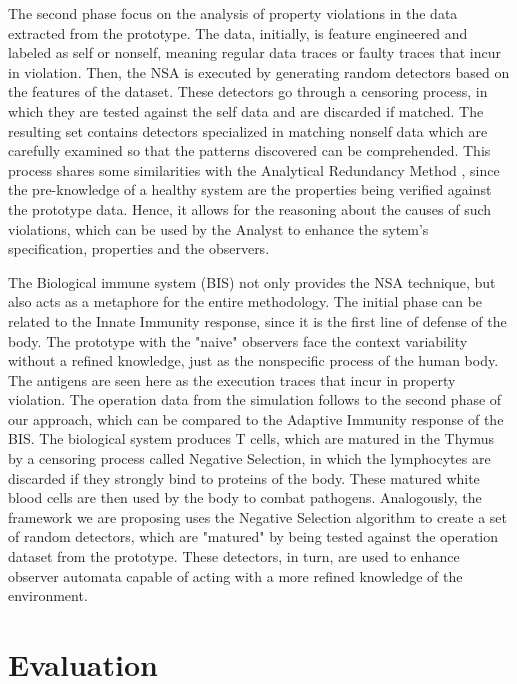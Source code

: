 The second phase focus on the analysis of property violations in the data extracted from the prototype. The data, initially, is feature engineered and labeled as self or nonself, meaning regular data traces or faulty traces that incur in violation. Then, the NSA is executed by generating random detectors based on the features of the dataset. These detectors go through a censoring process, in which they are tested against the self data and are discarded if matched. The resulting set contains detectors specialized in matching nonself data which are carefully examined so that the patterns discovered can be comprehended. This process shares some similarities with the Analytical Redundancy Method \cite{gao2015survey}, since the pre-knowledge of a healthy system are the properties being verified against the prototype data. Hence, it allows for the reasoning about the causes of such violations, which can be used by the Analyst to enhance the sytem's specification, properties and the observers.

The Biological immune system (BIS) not only provides the NSA technique, but also acts as a metaphore for the entire methodology. The initial phase can be related to the Innate Immunity response, since it is the first line of defense of the body. The prototype with the "naive" observers face the context variability without a refined knowledge, just as the nonspecific process of the human body. The antigens are seen here as the execution traces that incur in property violation. The operation data from the simulation follows to the second phase of our approach, which can be compared to the Adaptive Immunity response of the BIS. The biological system produces T cells, which are matured in the Thymus by a censoring process called Negative Selection, in which the lymphocytes are discarded if they strongly bind to proteins of the body. These matured white blood cells are then used by the body to combat pathogens. Analogously, the framework we are proposing uses the Negative Selection algorithm to create a set of random detectors, which are "matured" by being tested against the operation dataset from the prototype. These detectors, in turn, are used to enhance observer automata capable of acting with a more refined knowledge of the environment. 

\section{Evaluation}

